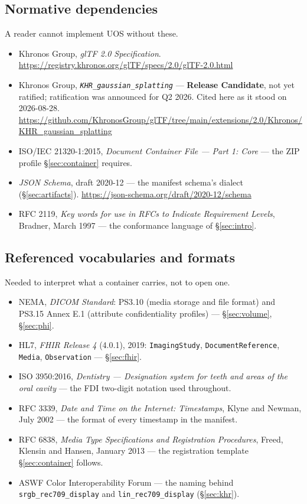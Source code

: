 \documentclass[11pt,a4paper]{article}
\newcommand{\code}[1]{\texttt{\small #1}}
\begin{document}
\subsection*{Normative dependencies}
A reader cannot implement UOS without these.

\begin{itemize}
  \item Khronos Group, \emph{glTF 2.0 Specification}.
  \url{https://registry.khronos.org/glTF/specs/2.0/glTF-2.0.html}
  \item Khronos Group, \emph{\code{KHR\_gaussian\_splatting}} --- \textbf{Release
  Candidate}, not yet ratified; ratification was announced for Q2 2026. Cited here as it
  stood on 2026-08-28.
  \url{https://github.com/KhronosGroup/glTF/tree/main/extensions/2.0/Khronos/KHR_gaussian_splatting}
  \item ISO/IEC 21320-1:2015, \emph{Document Container File --- Part 1: Core} --- the ZIP
  profile \S\ref{sec:container} requires.
  \item \emph{JSON Schema}, draft 2020-12 --- the manifest schema's dialect
  (\S\ref{sec:artifacts}). \url{https://json-schema.org/draft/2020-12/schema}
  \item RFC 2119, \emph{Key words for use in RFCs to Indicate Requirement Levels}, Bradner,
  March 1997 --- the conformance language of \S\ref{sec:intro}.
\end{itemize}

\subsection*{Referenced vocabularies and formats}
Needed to interpret what a container carries, not to open one.

\begin{itemize}
  \item NEMA, \emph{DICOM Standard}: PS3.10 (media storage and file format) and PS3.15
  Annex E.1 (attribute confidentiality profiles) --- \S\ref{sec:volume},
  \S\ref{sec:phi}.
  \item HL7, \emph{FHIR Release 4} (4.0.1), 2019: \code{ImagingStudy},
  \code{DocumentReference}, \code{Media}, \code{Observation} --- \S\ref{sec:fhir}.
  \item ISO 3950:2016, \emph{Dentistry --- Designation system for teeth and areas of the
  oral cavity} --- the FDI two-digit notation used throughout.
  \item RFC 3339, \emph{Date and Time on the Internet: Timestamps}, Klyne and Newman,
  July 2002 --- the format of every timestamp in the manifest.
  \item RFC 6838, \emph{Media Type Specifications and Registration Procedures}, Freed,
  Klensin and Hansen, January 2013 --- the registration template \S\ref{sec:container}
  follows.
  \item ASWF Color Interoperability Forum --- the naming behind
  \code{srgb\_rec709\_display} and \code{lin\_rec709\_display} (\S\ref{sec:khr}).
\end{itemize}
\end{document}
